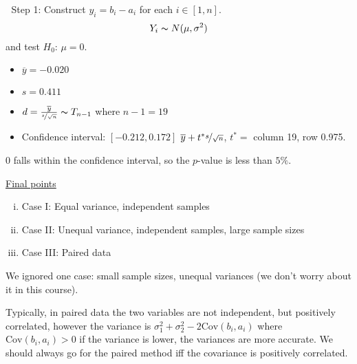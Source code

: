 \begin{exbox}
    \begin{example} $ \; $
        Step 1: Construct $ y_i=b_i-a_i $ for each $ i\in[1,n] $.
        \[ Y_i \thicksim N(\mu,\sigma^2) \]
        and test $ H_0 $: $ \mu=0 $.
        \begin{itemize}
            \item $ \overline{y}=-0.020 $
            \item $ s=0.411 $
            \item $ d=\frac{\overline{y}}{\nicefrac{s}{\sqrt{n}}}\thicksim T_{n-1} $ where $ n-1=19 $
            \item Confidence interval: $ \left[ -0.212,0.172 \right] $
                  \subitem $ \overline{y}+t^* \nicefrac{s}{\sqrt{n}} $, $ t^*= $ column 19, row 0.975.
        \end{itemize}
        $ 0 $ falls within the confidence interval, so the $ p $-value is less than $ 5\% $.
    \end{example}
\end{exbox}

\underline{Final points}
\begin{enumerate}[(i)]
    \item Case I: Equal variance, independent samples
    \item Case II: Unequal variance, independent samples, large sample sizes
    \item Case III: Paired data
\end{enumerate}
We ignored one case: small sample sizes, unequal variances (we don't worry about it in this course).

Typically, in paired data the two variables are not independent, but positively correlated,
however the variance is $ \sigma_1^2+\sigma_2^2-2\text{Cov}(b_i,a_i) $
where $ \text{Cov}(b_i,a_i)>0 $ if the variance is lower, the variances are more accurate.
We should always go for the paired method iff the covariance is positively correlated.
